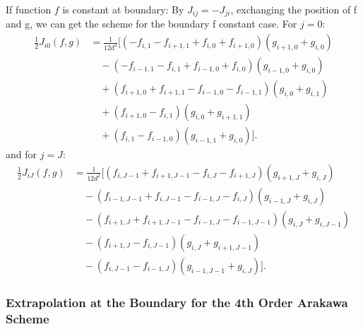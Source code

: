 If function $f$ is constant at boundary: By $J_{ij}=-J_{ji}$, exchanging the position of f and g, we can get the scheme for the boundary f constant case. For $j=0$:
\begin{equation}
	\begin{aligned}
		\frac{1}{2}J_{i0} (f,g) & = \frac{1}{12d^2}[(-f_{i,1}-f_{i+1,1}+f_{i,0}+f_{i+1,0})(g_{i+1,0}+g_{i,0})\\
		&\quad - (-f_{i-1,1}-f_{i,1}+f_{i-1,0}+f_{i,0})(g_{i-1,0}+g_{i,0})\\
		&\quad + (f_{i+1,0}+f_{i+1,1}-f_{i-1,0}-f_{i-1,1})(g_{i,0}+g_{i,1})\\
		&\quad + (f_{i+1,0}-f_{i,1})(g_{i,0}+g_{i+1,1})\\
		&\quad + (f_{i,1}-f_{i-1,0})(g_{i-1,1}+g_{i,0})].
	\end{aligned}
\end{equation}
and for $j=J$:
\begin{equation}
	\begin{aligned}
		\frac{1}{2}J_{iJ} (f,g) & = \frac{1}{12d^2}[(f_{i,J-1}+f_{i+1,J-1}-f_{i,J}-f_{i+1,J})(g_{i+1,J}+g_{i,J})\\
		& \quad - (f_{i-1,J-1}+f_{i,J-1}-f_{i-1,J}-f_{i,J})(g_{i-1,J}+g_{i,J})\\
		& \quad - (f_{i+1,J}+f_{i+1,J-1}-f_{i-1,J}-f_{i-1,J-1})(g_{i,J}+g_{i,J-1})\\
		& \quad - (f_{i+1,J}-f_{i,J-1})(g_{i,J}+g_{i+1,J-1})\\
		& \quad - (f_{i,J-1}-f_{i-1,J})(g_{i-1,J-1}+g_{i,J})].
	\end{aligned}
\end{equation}








\subsubsection{Extrapolation at the Boundary for the 4th Order Arakawa Scheme}

